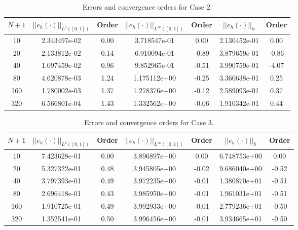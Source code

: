 \documentclass[a4paper, 12pt]{article}
\begin{document}
\begin{table}[!ht]
\caption{Errors and convergence orders for Case 2.}
\vspace{0.1in}
\centering
\begin{tabular}{|c|c|c| c| c| c| c|}
\hline
 $N+1$&  $||e_h(\cdot)||_{L^2([0,1])}$ & Order  & $||e_h(\cdot)||_{L^\infty([0,1])}$ & Order& $||e_h(\cdot)||_h$& Order \\
 \hline
     10  & 2.343497e-02 & 0.00 & 3.718547e-01  & 0.00 &  2.130452e-01 & 0.00 \\
     20  & 2.133812e-02 & 0.14 & 6.910094e-01  & -0.89 & 3.879659e-01 & -0.86\\
     40  & 1.097459e-02 & 0.96 & 9.852965e-01  & -0.51 & 3.990759e-01 & -4.07\\
     80  & 4.620878e-03 & 1.24 & 1.175112e+00  & -0.25 & 3.360638e-01 & 0.25\\
     160 & 1.780002e-03 & 1.37 & 1.278376e+00  & -0.12 & 2.589093e-01 & 0.37\\
     320 & 6.566801e-04 & 1.43 & 1.332562e+00  & -0.06 & 1.910342e-01 & 0.44\\
\hline
\end{tabular}
\label{tab:C2}
\end{table}

\begin{table}[!ht]
\caption{Errors and convergence orders for Case 3.}
\vspace{0.1in}
\centering
\begin{tabular}{|c|c|c| c| c| c| c|}
\hline
 $N+1$&  $||e_h(\cdot)||_{L^2([0,1])}$ & Order  & $||e_h(\cdot)||_{L^\infty([0,1])}$ & Order& $||e_h(\cdot)||_h$& Order \\
 \hline
     10  & 7.423628e-01 & 0.00 & 3.896897e+00 & 0.00  & 6.748753e+00 & 0.00 \\
     20  & 5.327322e-01 & 0.48 & 3.945805e+00 & -0.02 & 9.686040e+00 & -0.52\\
     40  & 3.797393e-01 & 0.49 & 3.972235e+00 & -0.01 & 1.380870e+01 & -0.51\\
     80  & 2.696418e-01 & 0.43 & 3.985950e+00 & -0.01 & 1.961031e+01 & -0.51\\
     160 & 1.910725e-01 & 0.49 & 3.992933e+00 & -0.01 & 2.779236e+01 & -0.50\\
     320 & 1.352541e-01 & 0.50 & 3.996456e+00 & -0.01 & 3.934665e+01 & -0.50\\
\hline
\end{tabular}
\label{tab:C3}
\end{table}
\end{document}
